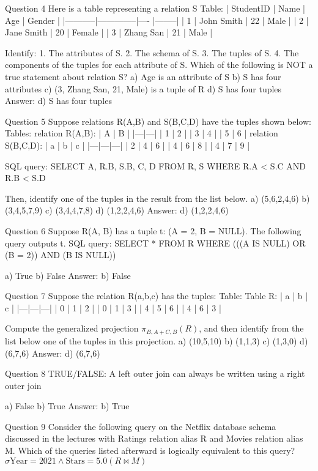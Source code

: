   Question 4
  Here is a table representing a relation S
  Table:
  | StudentID |     Name     | Age | Gender |
  |-----------|--------------|---- |--------|
  | 1         | John Smith   | 22  | Male   |
  | 2         | Jane Smith   | 20  | Female |
  | 3         | Zhang San    | 21  | Male   |
  
  Identify:
    1. The attributes of S.
    2. The schema of S.
    3. The tuples of S.
    4. The components of the tuples for each attribute of S.
  Which of the following is NOT a true statement about relation S?
  a) Age is an attribute of S
  b) S has four attributes
  c) (3, Zhang San, 21, Male) is a tuple of R
  d) S has four tuples
  Answer: d) S has four tuples

  Question 5
  Suppose relations R(A,B) and S(B,C,D) have the tuples shown below:
  Tables:
  relation R(A,B):
    | A | B |
    |---|---|
    | 1 | 2 |
    | 3 | 4 |
    | 5 | 6 |
  relation S(B,C,D):
    | a | b | c |
    |---|---|---|
    | 2 | 4 | 6 |
    | 4 | 6 | 8 |
    | 4 | 7 | 9 |

  SQL query:
    SELECT A, R.B, S.B, C, D
    FROM R, S
    WHERE R.A < S.C AND R.B < S.D

  Then, identify one of the tuples in the result from the list below.
  a) (5,6,2,4,6)
  b) (3,4,5,7,9)
  c) (3,4,4,7,8)
  d) (1,2,2,4,6)
  Answer: d) (1,2,2,4,6)

  Question 6
  Suppose R(A, B) has a tuple t: (A = 2, B = NULL).
  The following query outputs t.
  SQL query:
    SELECT *
    FROM R
    WHERE (((A IS NULL) OR (B = 2)) AND (B IS NULL))

  a) True
  b) False
  Answer: b) False

  Question 7
  Suppose the relation R(a,b,c) has the tuples:
  Table:
  Table R:
  | a | b | c |
  |---|---|---|
  | 0 | 1 | 2 |
  | 0 | 1 | 3 |
  | 4 | 5 | 6 |
  | 4 | 6 | 3 |

  Compute the generalized projection $\pi_{B,A+C,B}(R)$, and then identify from the list below one of the tuples in this projection.
  a) (10,5,10)
  b) (1,1,3)
  c) (1,3,0)
  d) (6,7,6)
  Answer: d) (6,7,6)

  Question 8
  TRUE/FALSE: A left outer join can always be written using a right outer join

  a) False
  b) True
  Answer: b) True

  Question 9 
  Consider the following query on the Netflix database schema discussed in the lectures with Ratings relation alias R and Movies relation alias M. Which of the queries listed afterward is logically equivalent to this query?
  $\sigma\text{Year} = 2021 \wedge \text{Stars} = 5.0(R \bowtie M)$


